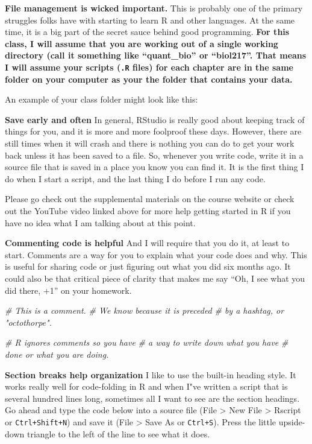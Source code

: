 \documentclass[
]{book}
\newenvironment{Shaded}{\begin{snugshade}}{\end{snugshade}}
\newcommand{\CommentTok}[1]{\textcolor[rgb]{0.56,0.35,0.01}{\textit{#1}}}
\begin{document}
\textbf{File management is wicked important.} This is probably one of the primary struggles folks have with starting to learn R and other languages. At the same time, it is a big part of the secret sauce behind good programming. \textbf{For this class, I will assume that you are working out of a single working directory (call it something like ``quant\_bio'' or ``biol217''. That means I will assume your scripts (\texttt{.R} files) for each chapter are in the same folder on your computer as your the folder that contains your data.}

An example of your class folder might look like this:

\textbf{Save early and often}
In general, RStudio is really good about keeping track of things for you, and it is more and more foolproof these days. However, there are still times when it will crash and there is nothing you can do to get your work back unless it has been saved to a file. So, whenever you write code, write it in a source file that is saved in a place you know you can find it. It is the first thing I do when I start a script, and the last thing I do before I run any code.

Please go check out the supplemental materials on the course website or check out the YouTube video linked above for more help getting started in R if you have no idea what I am talking about at this point.

\textbf{Commenting code is helpful}
And I will require that you do it, at least to start. Comments are a way for you to explain what your code does and why. This is useful for sharing code or just figuring out what you did six months ago. It could also be that critical piece of clarity that makes me say ``Oh, I see what you did there, +1'' on your homework.

\begin{Shaded}
\begin{Highlighting}[]
\CommentTok{# This is a comment.}
\CommentTok{# We know because it is preceded}
\CommentTok{# by a hashtag, or "octothorpe".}

\CommentTok{# R ignores comments so you have}
\CommentTok{# a way to write down what you have}
\CommentTok{# done or what you are doing.}
\end{Highlighting}
\end{Shaded}

\textbf{Section breaks help organization}
I like to use the built-in heading style. It works really well for code-folding in R and when I"ve written a script that is several hundred lines long, sometimes all I want to see are the section headings. Go ahead and type the code below into a source file (File \textgreater{} New File \textgreater{} Rscript or \texttt{Ctrl+Shift+N}) and save it (File \textgreater{} Save As or \texttt{Ctrl+S}). Press the little upside-down triangle to the left of the line to see what it does.
\end{document}
